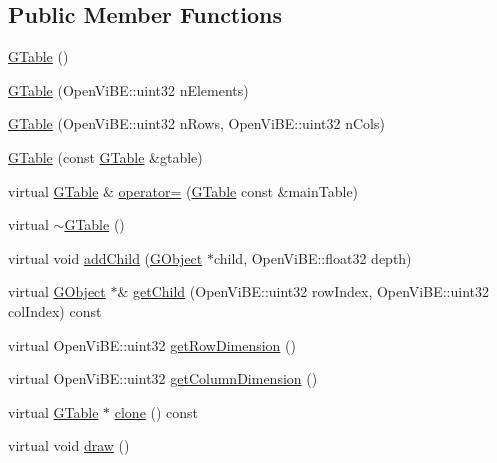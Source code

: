 \subsection*{Public Member Functions}
\begin{DoxyCompactItemize}
\item 
\hyperlink{classOpenViBEApplications_1_1GTable_a3b036821e44dbec7fe17869631e31230}{GTable} ()
\item 
\hyperlink{classOpenViBEApplications_1_1GTable_a0764d6159101a476f8009f58799bfc08}{GTable} (OpenViBE::uint32 nElements)
\item 
\hyperlink{classOpenViBEApplications_1_1GTable_a605a71557ff96da3033c19b10466afd1}{GTable} (OpenViBE::uint32 nRows, OpenViBE::uint32 nCols)
\item 
\hyperlink{classOpenViBEApplications_1_1GTable_af57176d23856149442f7a0c3d1928adc}{GTable} (const \hyperlink{classOpenViBEApplications_1_1GTable}{GTable} \&gtable)
\item 
virtual \hyperlink{classOpenViBEApplications_1_1GTable}{GTable} \& \hyperlink{classOpenViBEApplications_1_1GTable_aafbc6a9c1b2d9fe42015d232ea483ff7}{operator=} (\hyperlink{classOpenViBEApplications_1_1GTable}{GTable} const \&mainTable)
\item 
virtual \hyperlink{classOpenViBEApplications_1_1GTable_a714b6951d2bea8c6ab5de1d503c1e052}{$\sim$GTable} ()
\item 
virtual void \hyperlink{classOpenViBEApplications_1_1GTable_a7bc668fea9626c8804e36f316d6cfdb2}{addChild} (\hyperlink{classOpenViBEApplications_1_1GObject}{GObject} $\ast$child, OpenViBE::float32 depth)
\item 
virtual \hyperlink{classOpenViBEApplications_1_1GObject}{GObject} $\ast$\& \hyperlink{classOpenViBEApplications_1_1GTable_a839b7fd014dcaa9873b7b802f8754f52}{getChild} (OpenViBE::uint32 rowIndex, OpenViBE::uint32 colIndex) const 
\item 
virtual OpenViBE::uint32 \hyperlink{classOpenViBEApplications_1_1GTable_ad575565bab00f9a0485ad5192a2a09bd}{getRowDimension} ()
\item 
virtual OpenViBE::uint32 \hyperlink{classOpenViBEApplications_1_1GTable_a8d5fd31388a4ba3cd0caaa6ca206f5e9}{getColumnDimension} ()
\item 
virtual \hyperlink{classOpenViBEApplications_1_1GTable}{GTable} $\ast$ \hyperlink{classOpenViBEApplications_1_1GTable_a2e6be979857e1515b39ec6385576757b}{clone} () const 
\item 
virtual void \hyperlink{classOpenViBEApplications_1_1GTable_a85f6227c147fbbfee5afc93fbd3dcaf0}{draw} ()

\end{DoxyCompactItemize}
